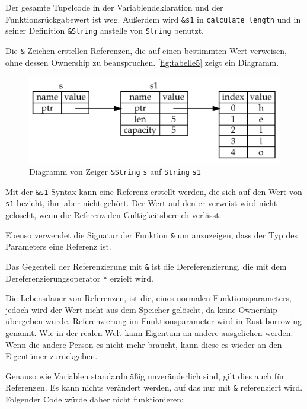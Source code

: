 Der gesamte Tupelcode in der Variablendeklaration und der Funk\-ti\-ons\-rück\-ga\-be\-wert ist weg. Außerdem wird \verb"&s1" in \verb"calculate_length" und in seiner Definition \verb"&String" anstelle von \verb"String" benutzt.

Die \verb"&"-Zeichen erstellen Referenzen, die auf einen bestimmten Wert verweisen, ohne dessen Ownership zu beanspruchen. \autoref{fig:tabelle5} zeigt ein Diagramm.

\begin{figure}[htbp]
    \centering
    \includegraphics[scale=0.9]{Programmierung/Tabelle5.pdf}
    \caption{Diagramm von Zeiger \texttt{\&String} \texttt{s} auf \texttt{String} \texttt{s1}}
    \label{fig:tabelle5}
\end{figure}

Mit der \verb"&s1" Syntax kann eine Referenz erstellt werden, die sich auf den Wert von \verb"s1" bezieht, ihm aber nicht gehört. Der Wert auf den er verweist wird nicht gelöscht, wenn die Referenz den Gültigkeitsbereich verlässt.

Ebenso verwendet die Signatur der Funktion \verb"&" um anzuzeigen, dass der Typ des Parameters eine Referenz ist.

Das Gegenteil der Referenzierung mit \verb"&" ist die Dereferenzierung, die mit dem Dereferenzierungsoperator \verb"*" erzielt wird.

Die Lebensdauer von Referenzen, ist die, eines normalen Funktionsparameters, jedoch wird der Wert nicht aus dem Speicher gelöscht, da keine Ownership übergeben wurde. Referenzierung im Funktionsparameter wird in Rust \glqq borrowing\grqq{} genannt. Wie in der realen Welt kann Eigentum an andere ausgeliehen werden. Wenn die andere Person es nicht mehr braucht, kann diese es wieder an den Eigentümer zurückgeben.

Genauso wie Variablen standardmäßig unveränderlich sind, gilt dies auch für Referenzen. Es kann nichts verändert werden, auf das nur mit \verb"&" referenziert wird. Folgender Code würde daher nicht funktionieren:

